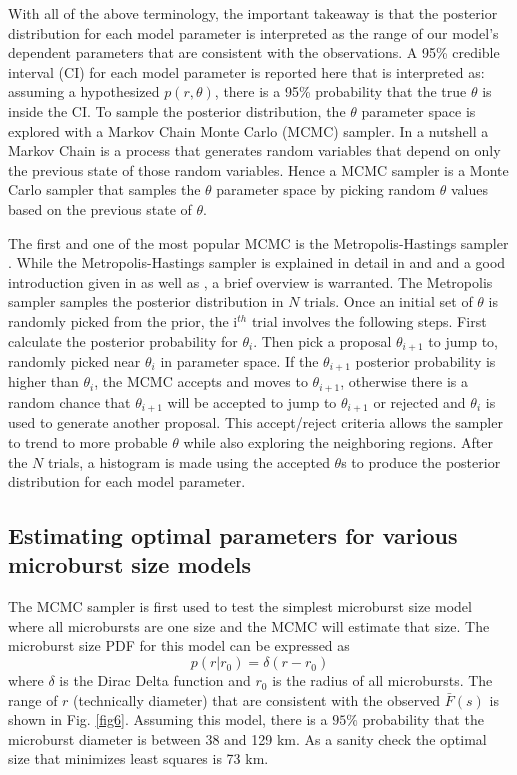 \documentclass[draft]{agujournal2019}
\begin{document}
With all of the above terminology, the important takeaway is that the posterior distribution for each model parameter is interpreted as the range of our model's dependent parameters that are consistent with the observations. A 95\% credible interval (CI) for each model parameter is reported here that is interpreted as: assuming a hypothesized $p(r, \theta)$, there is a 95\% probability that the true $\theta$ is inside the CI. To sample the posterior distribution, the $\theta$ parameter space is explored with a Markov Chain Monte Carlo (MCMC) sampler. In a nutshell a Markov Chain is a process that generates random variables that depend on only the previous state of those random variables. Hence a MCMC sampler is a Monte Carlo sampler that samples the $\theta$ parameter space by picking random $\theta$ values based on the previous state of $\theta$. 

The first and one of the most popular MCMC is the Metropolis-Hastings sampler \cite{Metropolis1953, Hastings1970}. While the Metropolis-Hastings sampler is explained in detail in  and  and a good introduction given in  as well as , a brief overview is warranted. The Metropolis sampler samples the posterior distribution in $N$ trials. Once an initial set of $\theta$ is randomly picked from the prior, the i$^{th}$ trial involves the following steps. First calculate the posterior probability for $\theta_i$. Then pick a proposal $\theta_{i+1}$ to jump to, randomly picked near $\theta_i$ in parameter space. If the $\theta_{i+1}$ posterior probability is higher than $\theta_i$, the MCMC accepts and moves to $\theta_{i+1}$, otherwise there is a random chance that $\theta_{i+1}$ will be accepted to jump to $\theta_{i+1}$ or rejected and $\theta_i$ is used to generate another proposal. This accept/reject criteria allows the sampler to trend to more probable $\theta$ while also exploring the neighboring regions. After the $N$ trials, a histogram is made using the accepted $\theta$s to produce the posterior distribution for each model parameter.


\subsection{Estimating optimal parameters for various microburst size models}
The MCMC sampler is first used to test the simplest microburst size model where all microbursts are one size and the MCMC will estimate that size. The microburst size PDF for this model can be expressed as
\begin{equation}
p(r | r_0) = \delta(r-r_0)
\end{equation} where $\delta$ is the Dirac Delta function and $r_0$ is the radius of all microbursts. The range of $r$ (technically diameter) that are consistent with the observed $\bar{F}(s)$ is shown in Fig. \ref{fig6}. Assuming this model, there is a $95 \%$ probability that the microburst diameter is between 38 and 129 km. As a sanity check the optimal size that minimizes least squares is 73 km.
\end{document}
